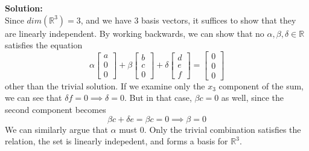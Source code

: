 \documentclass[]{article}
\newcommand{\R}{\mathbb{R}}				%
\newcommand{\bbm}{\begin{bmatrix}}		%
\newcommand{\ebm}{\end{bmatrix}}		%
\newcommand{\solution}{\vskip 0.5cm \textbf{\large Solution:} \\}
\begin{document}
\begin{enumerate}[resume]
	  \solution

	  Since $dim(\R^3) = 3$, and we have 3 basis vectors, it suffices
      to show that they are linearly independent. By working
      backwards, we can show that no $\alpha, \beta, \delta \in \R$
      satisfies the equation
      \[
      \alpha \bbm a\\0\\0\ebm + \beta \bbm b\\c\\0\ebm + \delta \bbm d\\e\\f\ebm = \bbm 0\\0\\0 \ebm
      \]
      other than the trivial solution. If we examine only the $x_3$
      component of the sum, we can see that $\delta f = 0 \implies
      \delta = 0$. But in that case, $\beta c = 0$ as well, since the
      second component becomes
      \[
      \beta c + \delta e = \beta c = 0 \implies \beta = 0
      \]
      We can similarly argue that $\alpha$ must 0. Only the trivial
      combination satisfies the relation, the set is linearly
      indepedent, and forms a basis for $\R^3$.

    \end{enumerate}
\end{document}
